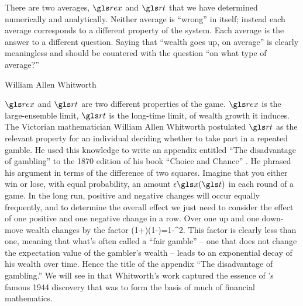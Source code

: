 There are two averages, $\rex$ and $\rt$ that we have determined numerically and analytically. 
Neither average is ``wrong'' in itself; instead each average corresponds to a different property
of the system. Each average is the answer to a different question. Saying that ``wealth 
goes up, on average'' is clearly meaningless and should be countered with the question 
``on what type of average?'' 


\begin{history}{William Allen Whitworth}

$\rex$ and $\rt$ are two different properties of the game. $\rex$ is 
the large-ensemble limit, $\rt$ is the long-time limit, of wealth growth it induces. The Victorian 
mathematician William Allen Whitworth postulated $\rt$ as the relevant property 
for an individual deciding whether to take part in a repeated gamble. 
He used this knowledge to write an appendix  entitled ``The disadvantage 
of gambling'' to the 1870 edition of his book ``Choice and Chance'' 
\cite{Whitworth1870}. He phrased his argument in terms of the difference of two squares. 
Imagine that you either win or lose, with equal probability, 
an amount $\epsilon \x(\t)$ in each round of a game. In the long run, positive and 
negative changes will occur equally frequently, and to determine
the overall effect we just need to consider the effect of one positive and one negative change
in a row. Over one up and one down-move wealth changes by the factor
\be
(1+\epsilon)(1-\epsilon)=1-\epsilon^2.
\ee
This factor is clearly less than one, meaning that what's often called a ``fair gamble'' -- one 
that does not change the expectation value of the gambler's wealth -- leads to an 
exponential decay of his wealth over time. Hence the title of the appendix 
``The disadvantage of gambling.'' We will see in  that Whitworth's work
captured the essence of \Ito's famous 1944 discovery \cite{Ito1944} that was to form the basis of
much of financial mathematics.


\end{history}

